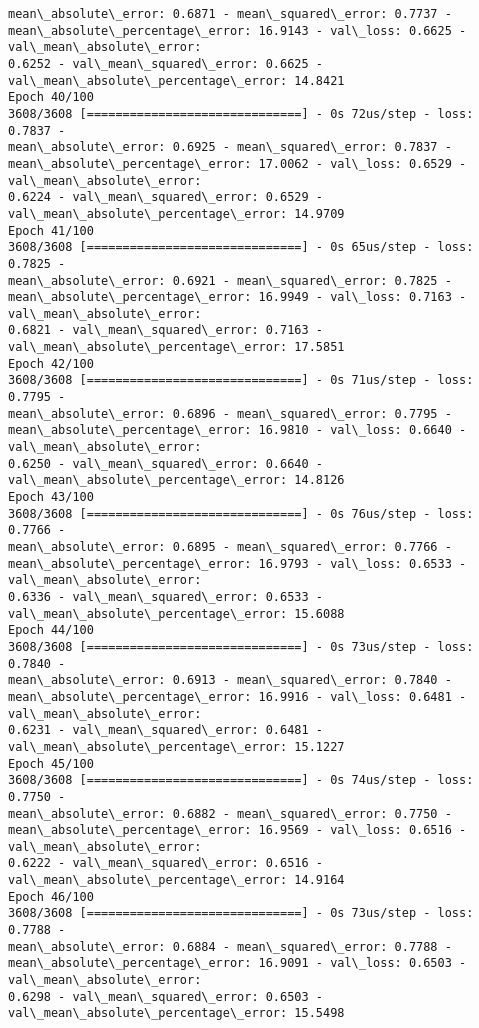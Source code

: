 \documentclass[11pt]{article}
\begin{document}
\begin{Verbatim}[commandchars=\\\{\},fontsize=\footnotesize]
mean\_absolute\_error: 0.6871 - mean\_squared\_error: 0.7737 -
mean\_absolute\_percentage\_error: 16.9143 - val\_loss: 0.6625 - val\_mean\_absolute\_error:
0.6252 - val\_mean\_squared\_error: 0.6625 - val\_mean\_absolute\_percentage\_error: 14.8421
Epoch 40/100
3608/3608 [==============================] - 0s 72us/step - loss: 0.7837 -
mean\_absolute\_error: 0.6925 - mean\_squared\_error: 0.7837 -
mean\_absolute\_percentage\_error: 17.0062 - val\_loss: 0.6529 - val\_mean\_absolute\_error:
0.6224 - val\_mean\_squared\_error: 0.6529 - val\_mean\_absolute\_percentage\_error: 14.9709
Epoch 41/100
3608/3608 [==============================] - 0s 65us/step - loss: 0.7825 -
mean\_absolute\_error: 0.6921 - mean\_squared\_error: 0.7825 -
mean\_absolute\_percentage\_error: 16.9949 - val\_loss: 0.7163 - val\_mean\_absolute\_error:
0.6821 - val\_mean\_squared\_error: 0.7163 - val\_mean\_absolute\_percentage\_error: 17.5851
Epoch 42/100
3608/3608 [==============================] - 0s 71us/step - loss: 0.7795 -
mean\_absolute\_error: 0.6896 - mean\_squared\_error: 0.7795 -
mean\_absolute\_percentage\_error: 16.9810 - val\_loss: 0.6640 - val\_mean\_absolute\_error:
0.6250 - val\_mean\_squared\_error: 0.6640 - val\_mean\_absolute\_percentage\_error: 14.8126
Epoch 43/100
3608/3608 [==============================] - 0s 76us/step - loss: 0.7766 -
mean\_absolute\_error: 0.6895 - mean\_squared\_error: 0.7766 -
mean\_absolute\_percentage\_error: 16.9793 - val\_loss: 0.6533 - val\_mean\_absolute\_error:
0.6336 - val\_mean\_squared\_error: 0.6533 - val\_mean\_absolute\_percentage\_error: 15.6088
Epoch 44/100
3608/3608 [==============================] - 0s 73us/step - loss: 0.7840 -
mean\_absolute\_error: 0.6913 - mean\_squared\_error: 0.7840 -
mean\_absolute\_percentage\_error: 16.9916 - val\_loss: 0.6481 - val\_mean\_absolute\_error:
0.6231 - val\_mean\_squared\_error: 0.6481 - val\_mean\_absolute\_percentage\_error: 15.1227
Epoch 45/100
3608/3608 [==============================] - 0s 74us/step - loss: 0.7750 -
mean\_absolute\_error: 0.6882 - mean\_squared\_error: 0.7750 -
mean\_absolute\_percentage\_error: 16.9569 - val\_loss: 0.6516 - val\_mean\_absolute\_error:
0.6222 - val\_mean\_squared\_error: 0.6516 - val\_mean\_absolute\_percentage\_error: 14.9164
Epoch 46/100
3608/3608 [==============================] - 0s 73us/step - loss: 0.7788 -
mean\_absolute\_error: 0.6884 - mean\_squared\_error: 0.7788 -
mean\_absolute\_percentage\_error: 16.9091 - val\_loss: 0.6503 - val\_mean\_absolute\_error:
0.6298 - val\_mean\_squared\_error: 0.6503 - val\_mean\_absolute\_percentage\_error: 15.5498

\end{Verbatim}
\end{document}

